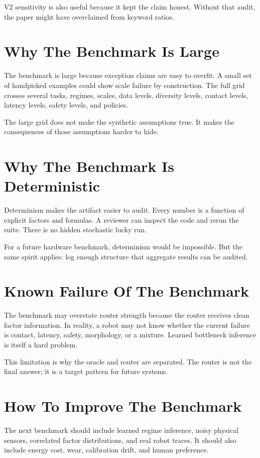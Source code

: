 V2 sensitivity is also useful because it kept the claim honest. Without that audit, the paper might have overclaimed from keyword ratios.

\section{Why The Benchmark Is Large}

The benchmark is large because exception claims are easy to overfit. A small set of handpicked examples could show scale failure by construction. The full grid crosses several tasks, regimes, scales, data levels, diversity levels, contact levels, latency levels, safety levels, and policies.

The large grid does not make the synthetic assumptions true. It makes the consequences of those assumptions harder to hide.

\section{Why The Benchmark Is Deterministic}

Determinism makes the artifact easier to audit. Every number is a function of explicit factors and formulas. A reviewer can inspect the code and rerun the suite. There is no hidden stochastic lucky run.

For a future hardware benchmark, determinism would be impossible. But the same spirit applies: log enough structure that aggregate results can be audited.

\section{Known Failure Of The Benchmark}

The benchmark may overstate router strength because the router receives clean factor information. In reality, a robot may not know whether the current failure is contact, latency, safety, morphology, or a mixture. Learned bottleneck inference is itself a hard problem.

This limitation is why the oracle and router are separated. The router is not the final answer; it is a target pattern for future systems.

\section{How To Improve The Benchmark}

The next benchmark should include learned regime inference, noisy physical sensors, correlated factor distributions, and real robot traces. It should also include energy cost, wear, calibration drift, and human preference.

